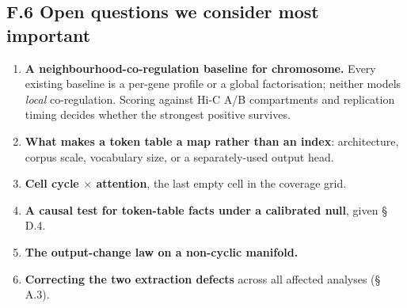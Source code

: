 \hypertarget{f.6-open-questions-we-consider-most-important}{%
\subsection{F.6 Open questions we consider most important}\label{f.6-open-questions-we-consider-most-important}}

\begin{enumerate}
\def\labelenumi{\arabic{enumi}.}
\tightlist
\item
  \textbf{A neighbourhood-co-regulation baseline for chromosome.} Every existing baseline is a per-gene
  profile or a global factorisation; neither models \emph{local} co-regulation. Scoring against Hi-C A/B
  compartments and replication timing decides whether the strongest positive survives.
\item
  \textbf{What makes a token table a map rather than an index}: architecture, corpus scale, vocabulary
  size, or a separately-used output head.
\item
  \textbf{Cell cycle \(\times\) attention}, the last empty cell in the coverage grid.
\item
  \textbf{A causal test for token-table facts under a calibrated null}, given \S\,D.4.
\item
  \textbf{The output-change law on a non-cyclic manifold.}
\item
  \textbf{Correcting the two extraction defects} across all affected analyses (\S\,A.3).
\end{enumerate}
